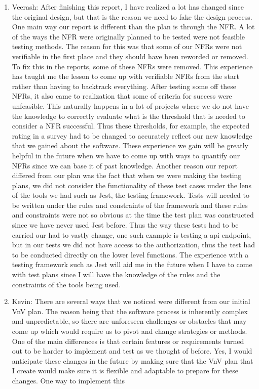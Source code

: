 \documentclass[12pt, titlepage]{article}
\begin{document}
\begin{enumerate}
    \item Veerash: After finishing this report, I have realized a lot has changed since the original design, but that is the reason we need to fake the design process. One main way our report is different than the plan is through the NFR. A lot of the ways the NFR were originally planned to be tested were not feasible testing methods. The reason for this was that some of our NFRs were not verifiable in the first place and they should have been reworded or removed. To fix this in the reports, some of these NFRs were removed. This experience has taught me the lesson to come up with verifiable NFRs from the start rather than having to backtrack everything. After testing some off these NFRs, it also came to realization that some of criteria for success were unfeasible. This naturally happens in a lot of projects where we do not have the knowledge to correctly evaluate what is the threshold that is needed to consider a NFR successful. Thus these thresholds, for example, the expected rating in a survey had to be changed to accurately reflect our new knowledge that we gained about the software. These experience we gain will be greatly helpful in the future when we have to come up with ways to quantify our NFRs since we can base it of past knowledge. Another reason our report differed from our plan was the fact that when we were making the testing plans, we did not consider the functionality of these test cases under the lens of the tools we had such as Jest, the testing framework. Tests will needed to be written under the rules and constraints of the framework and these rules and constraints were not so obvious at the time the test plan was constructed since we have never used Jest before. Thus the way these tests had to be carried our had to vastly change, one such example is testing a api endpoint, but in our tests we did not have access to the authorization, thus the test had to be conducted directly on the lower level functions. The experience with a testing framework such as Jest will aid me in the future when I have to come with test plans since I will have the knowledge of the rules and the constraints of the tools being used.
    \item Kevin: There are several ways that we noticed were different from our initial VnV plan. The reason being that the software process is inherently complex and unpredictable, so there are unforeseen challenges or obstacles that may come up which would require us to pivot and change strategies or methods. One of the main differences is that certain features or requirements turned out to be harder to implement and test as we thought of before. Yes, I would anticipate these changes in the future by making sure that the VnV plan that I create would make sure it is flexible and adaptable to prepare for these changes. One way to implement this 

\end{enumerate}
\end{document}
